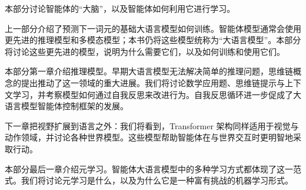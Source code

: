 本部分讨论智能体的“大脑”，以及智能体如何利用它进行学习。

上一部分介绍了预测下一词元的基础大语言模型如何训练。智能体模型通常会使用更先进的推理模型和多模态模型；本书仍将这些模型统称为“大语言模型”。本部分将讨论这些更先进的模型，说明为什么需要它们，以及如何训练和使用它们。

本部分第一章介绍推理模型。早期大语言模型无法解决简单的推理问题，思维链概念的提出推动了这一领域的重大进展。我们将讨论数学应用题、思维链提示与上下文学习，并考察模型如何通过自我反思来改进行为。自我反思循环进一步促成了大语言模型智能体控制框架的发展。

下一章把视野扩展到语言之外：我们将看到，Transformer 架构同样适用于视觉与动作领域，并讨论各种世界模型。这些模型帮助智能体在与世界交互时更明智地采取行动。

本部分最后一章介绍元学习。智能体大语言模型中的多种学习方式都体现了这一范式。我们将讨论元学习是什么，以及为什么它是一种富有挑战的机器学习形式。

